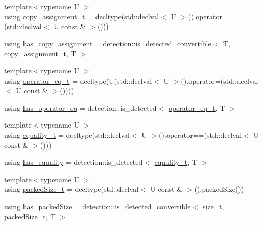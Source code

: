 \begin{DoxyCompactItemize}
\item 
{\footnotesize template$<$typename U $>$ }\\using \hyperlink{structvt_1_1index_1_1_index_traits_ad8fed19c85f6bf6fb280a492c4bf04c5}{copy\+\_\+assignment\+\_\+t} = decltype(std\+::declval$<$ U $>$().operator=(std\+::declval$<$ U const  \& $>$()))
\item 
using \hyperlink{structvt_1_1index_1_1_index_traits_a2ff2ef964f69ad35d99697ad657da0c3}{has\+\_\+copy\+\_\+assignment} = detection\+::is\+\_\+detected\+\_\+convertible$<$ T, \hyperlink{structvt_1_1index_1_1_index_traits_ad8fed19c85f6bf6fb280a492c4bf04c5}{copy\+\_\+assignment\+\_\+t}, T $>$
\item 
{\footnotesize template$<$typename U $>$ }\\using \hyperlink{structvt_1_1index_1_1_index_traits_a23832f22385d2d20bb1fc9885aef6146}{operator\+\_\+eq\+\_\+t} = decltype(U(std\+::declval$<$ U $>$().operator=(std\+::declval$<$ U const  \& $>$())))
\item 
using \hyperlink{structvt_1_1index_1_1_index_traits_a93695cc99aee3cbdc63a3e2ab9b3f6be}{has\+\_\+operator\+\_\+eq} = detection\+::is\+\_\+detected$<$ \hyperlink{structvt_1_1index_1_1_index_traits_a23832f22385d2d20bb1fc9885aef6146}{operator\+\_\+eq\+\_\+t}, T $>$
\item 
{\footnotesize template$<$typename U $>$ }\\using \hyperlink{structvt_1_1index_1_1_index_traits_a87c63bbffab452de516eb2dbc93c07e3}{equality\+\_\+t} = decltype(std\+::declval$<$ U $>$().operator==(std\+::declval$<$ U const  \& $>$()))
\item 
using \hyperlink{structvt_1_1index_1_1_index_traits_abd8f9e796291242c027dd33d9a21acab}{has\+\_\+equality} = detection\+::is\+\_\+detected$<$ \hyperlink{structvt_1_1index_1_1_index_traits_a87c63bbffab452de516eb2dbc93c07e3}{equality\+\_\+t}, T $>$
\item 
{\footnotesize template$<$typename U $>$ }\\using \hyperlink{structvt_1_1index_1_1_index_traits_a6d511f10a88cd9fb5b4d832127ce5044}{packed\+Size\+\_\+t} = decltype(std\+::declval$<$ U const  \& $>$().packed\+Size())
\item 
using \hyperlink{structvt_1_1index_1_1_index_traits_a257797ee702aa2108e9950f9aba373a4}{has\+\_\+packed\+Size} = detection\+::is\+\_\+detected\+\_\+convertible$<$ size\+\_\+t, \hyperlink{structvt_1_1index_1_1_index_traits_a6d511f10a88cd9fb5b4d832127ce5044}{packed\+Size\+\_\+t}, T $>$
\item 

\end{DoxyCompactItemize}
